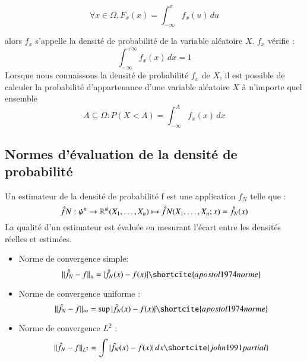 \begin{equation}
   \forall x \in \Omega, F_x(x) = \int_{-\infty}^{x} f_x(u)\,du
\end{equation}

alors  $f_x$    s’appelle la densité de probabilité de la variable aléatoire $X$.  $f_x$ vérifie :
\begin{equation}
\int_{-\infty}^{+\infty} f_x(x)\,dx = 1
\end{equation}
Lorsque nous connaissons la densité de probabilité  $f_x$  de $X$, il est possible de calculer la probabilité d’appartenance d’une variable aléatoire $X$ à n’importe quel ensemble 
\begin{equation}
A\subseteq \Omega : P(X<A)=\int_{-\infty}^A f_x(x)\,dx
\end{equation}
\subsection{Normes d'évaluation de la densité de probabilité}
Un estimateur de la densité de probabilité f est une application $f_N$ telle que :
\begin{equation}
{\hat f}{N}: \psi^n \rightarrow \mathbb{R}^\psi \\ (X_1,\dots,X_n) \mapsto {\hat f}{N}(X_1,\dots,X_n;x) = {\hat f}_{N}(x)
\end{equation}
La qualité d'un estimateur est évaluée en mesurant l'écart entre les densités réelles et estimées.
\begin{itemize}
  \item Norme de convergence simple:
\begin{equation}
\|{\hat f}_{N} - f\|_x = |{\hat f}_{N}(x) - f(x)|\\\shortcite{apostol1974norme}
\end{equation}
  \item Norme de convergence uniforme : 
  \begin{equation}
\|{\hat f}_{N} - f\|_{\infty} = \sup|{\hat f}_{N}(x) - f(x)|\\\shortcite{apostol1974norme}
\end{equation}
  \item Norme de convergence $L^2$  :
  \begin{equation}
\|{\hat f}_{N} - f\|_{L^2} = \int |{\hat f}_{N}(x) - f(x)| \, dx
\\\shortcite{john1991partial}
\end{equation}
\end{itemize}


